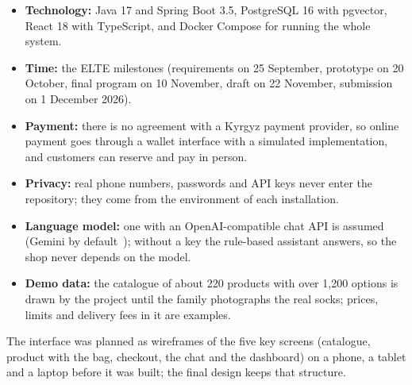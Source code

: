 \begin{itemize}
	\item \textbf{Technology:} Java 17 and Spring Boot 3.5, PostgreSQL 16 with pgvector, React 18 with TypeScript, and
	Docker Compose for running the whole system.
	\item \textbf{Time:} the ELTE milestones (requirements on 25 September, prototype on 20 October, final program on
	10 November, draft on 22 November, submission on 1 December 2026).
	\item \textbf{Payment:} there is no agreement with a Kyrgyz payment provider, so online payment goes through a wallet
	interface with a simulated implementation, and customers can reserve and pay in person.
	\item \textbf{Privacy:} real phone numbers, passwords and API keys never enter the repository; they come from the
	environment of each installation.
	\item \textbf{Language model:} one with an OpenAI-compatible chat API is assumed (Gemini by default~\cite{gemini});
	without a key the rule-based assistant answers, so the shop never depends on the model.
	\item \textbf{Demo data:} the catalogue of about 220 products with over 1,200 options is drawn by the project until
	the family photographs the real socks; prices, limits and delivery fees in it are examples.
\end{itemize}

The interface was planned as wireframes of the five key screens (catalogue, product with the bag, checkout, the chat
and the dashboard) on a phone, a tablet and a laptop before it was built; the final design keeps that structure.
